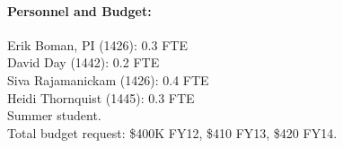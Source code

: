 \documentclass[10pt]{amsart}
\begin{document}
\paragraph{\bf Personnel and Budget:}
Erik Boman, PI (1426): 0.3 FTE\\
David Day (1442): 0.2 FTE\\
Siva Rajamanickam (1426): 0.4 FTE\\
Heidi Thornquist (1445): 0.3 FTE\\
Summer student.\\

Total budget request: \$400K FY12, \$410 FY13, \$420 FY14.
\end{document}
